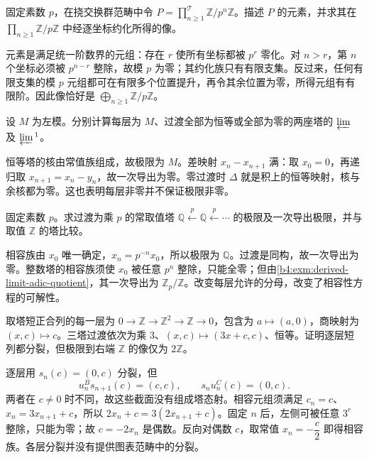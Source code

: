 \begin{exercise}\label{b4:ex:13-torsion-product-bound}
	固定素数 \(p\)，在挠交换群范畴中令 \(P=\prod_{n\ge1}^{\mathcal T}\mathbb Z/p^n\mathbb Z\)。描述 \(P\) 的元素，并求其在 \(\prod_{n\ge1}\mathbb Z/p\mathbb Z\) 中经逐坐标约化所得的像。
\end{exercise}
\begin{solution}
	元素是满足统一阶数界的元组：存在 \(r\) 使所有坐标都被 \(p^r\) 零化。对 \(n>r\)，第 \(n\) 个坐标必须被 \(p^{n-r}\) 整除，故模 \(p\) 为零；其约化族只有有限支集。反过来，任何有限支集的模 \(p\) 元组都可在有限多个位置提升，再令其余位置为零，所得元组有有限阶。因此像恰好是 \(\bigoplus_{n\ge1}\mathbb Z/p\mathbb Z\)。
\end{solution}

\begin{exercise}\label{b4:ex:13-constant-zero-towers}
	设 \(M\) 为左模。分别计算每层为 \(M\)、过渡全部为恒等或全部为零的两座塔的 \(\varprojlim\) 及 \(\varprojlim{}^1\)。
\end{exercise}
\begin{solution}
	恒等塔的核由常值族组成，故极限为 \(M\)。差映射 \(x_n-x_{n+1}\) 满：取 \(x_0=0\)，再递归取 \(x_{n+1}=x_n-y_n\)，故一次导出为零。零过渡时 \(\Delta\) 就是积上的恒等映射，核与余核都为零。这也表明每层非零并不保证极限非零。
\end{solution}

\begin{exercise}\label{b4:ex:13-rational-tower}
	固定素数 \(p\)。求过渡为乘 \(p\) 的常取值塔 \(\mathbb Q\xleftarrow{p}\mathbb Q\xleftarrow{p}\cdots\) 的极限及一次导出极限，并与取值 \(\mathbb Z\) 的塔比较。
\end{exercise}
\begin{solution}
	相容族由 \(x_0\) 唯一确定，\(x_n=p^{-n}x_0\)，所以极限为 \(\mathbb Q\)。过渡是同构，故一次导出为零。整数塔的相容族须使 \(x_0\) 被任意 \(p^n\) 整除，只能全零；但由\cref{b4:exm:derived-limit-adic-quotient}，其一次导出为 \(\mathbb Z_p/\mathbb Z\)。改变每层允许的分母，改变了相容性方程的可解性。
\end{solution}

\begin{exercise}\label{b4:ex:13-stagewise-split}
	取塔短正合列的每一层为 \(0\to\mathbb Z\to\mathbb Z^2\to\mathbb Z\to0\)，包含为 \(a\mapsto(a,0)\)，商映射为 \((x,c)\mapsto c\)。三塔过渡依次为乘 \(3\)、\((x,c)\mapsto(3x+c,c)\)、恒等。证明逐层短列都分裂，但极限到右端 \(\mathbb Z\) 的像仅为 \(2\mathbb Z\)。
\end{exercise}
\begin{solution}
	逐层用 \(s_n(c)=(0,c)\) 分裂，但
	\[
		u_n^Bs_{n+1}(c)=(c,c),\qquad s_nu_n^C(c)=(0,c).
	\]
	两者在 \(c\ne0\) 时不同，故这些截面没有组成塔态射。相容元组须满足 \(c_n=c\)、\(x_n=3x_{n+1}+c\)，所以 \(2x_n+c=3(2x_{n+1}+c)\)。固定 \(n\) 后，左侧可被任意 \(3^r\) 整除，只能为零；故 \(c=-2x_n\) 是偶数。反向对偶数 \(c\)，取常值 \(x_n=-\dfrac c2\) 即得相容族。各层分裂并没有提供图表范畴中的分裂。
\end{solution}

